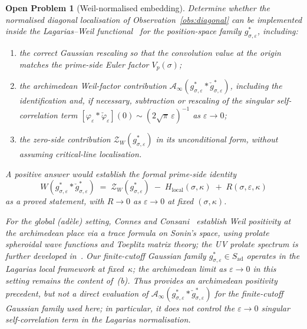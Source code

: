 \documentclass[11pt]{article}
\newtheorem{openproblem}[theorem]{Open Problem}
\newcommand{\Hlocal}{H_{\mathrm{local}}}
\newcommand{\Sad}{S_{\mathrm{ad}}}
\begin{document}
\begin{openproblem}[Weil-normalised embedding]\label{op:weil}
Determine whether the normalised diagonal localisation of
Observation~\ref{obs:diagonal} can be implemented inside the
Lagarias--Weil functional~\cite{Lagarias} for the position-space
family $g^*_{\sigma,\varepsilon}$, including:
\begin{enumerate}
\item[(a)] the correct Gaussian rescaling so that the convolution
value at the origin matches the prime-side Euler factor
$V_p(\sigma)$;
\item[(b)] the archimedean Weil-factor contribution
$\mathcal{A}_\infty(g^*_{\sigma,\varepsilon}
*\check g^*_{\sigma,\varepsilon})$,
including the identification and, if necessary, subtraction or
rescaling of the singular self-correlation term
$[\varphi_\varepsilon*\check\varphi_\varepsilon](0)
\sim (2\sqrt\pi\,\varepsilon)^{-1}$
as $\varepsilon\to 0$;
\item[(c)] the zero-side contribution
$\mathcal{Z}_W(g^*_{\sigma,\varepsilon})$ in its unconditional
form, without assuming critical-line localisation.
\end{enumerate}
A positive answer would establish the formal prime-side identity
\[
W(g^*_{\sigma,\varepsilon}*\check g^*_{\sigma,\varepsilon})
\;=\; \mathcal{Z}_W(g^*_{\sigma,\varepsilon})
\;-\;\Hlocal(\sigma,\kappa)
\;+\; R(\sigma,\varepsilon,\kappa)
\]
as a proved statement, with $R\to 0$ as $\varepsilon\to 0$
at fixed $(\sigma,\kappa)$.

For the global (ad\`ele) setting, Connes and
Consani~\cite{ConnesConsani21} establish Weil positivity at
the archimedean place via a trace formula on Sonin's space,
using prolate spheroidal wave functions and Toeplitz matrix
theory; the UV prolate spectrum is further developed
in~\cite{ConnesMoscovici22}.
Our finite-cutoff Gaussian family
$g^*_{\sigma,\varepsilon}\in\Sad$ operates in the
Lagarias local framework at fixed~$\kappa$; the archimedean
limit as $\varepsilon\to 0$ in this setting remains the
content of~(b).
Thus \cite{ConnesConsani21} provides an archimedean positivity
precedent, but not a direct evaluation of
$\mathcal{A}_\infty(g^*_{\sigma,\varepsilon}
*\check g^*_{\sigma,\varepsilon})$
for the finite-cutoff Gaussian family used here; in particular,
it does not control the $\varepsilon\to 0$ singular
self-correlation term in the Lagarias normalisation.
\end{openproblem}
\end{document}
